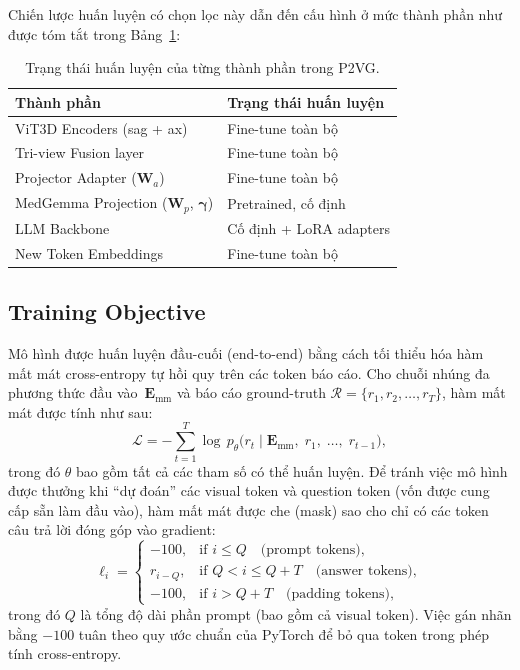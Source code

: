 Chiến lược huấn luyện có chọn lọc này dẫn đến cấu hình ở mức thành phần như được tóm tắt trong Bảng~\ref{tab:trainable}:

\begin{table}[t]
\centering
\caption{Trạng thái huấn luyện của từng thành phần trong P2VG.}
\label{tab:trainable}
\begin{tabular}{ll}
\toprule
\textbf{Thành phần} & \textbf{Trạng thái huấn luyện} \\
\midrule
ViT3D Encoders (sag + ax) & Fine-tune toàn bộ \\
Tri-view Fusion layer      & Fine-tune toàn bộ \\
Projector Adapter ($\mathbf{W}_a$) & Fine-tune toàn bộ \\
MedGemma Projection ($\mathbf{W}_p$, $\boldsymbol{\gamma}$) & Pretrained, cố định \\
LLM Backbone               & Cố định + LoRA adapters \\
New Token Embeddings        & Fine-tune toàn bộ \\
\bottomrule
\end{tabular}
\end{table}


\subsection{Training Objective}

Mô hình được huấn luyện đầu-cuối (end-to-end) bằng cách tối thiểu hóa hàm mất mát cross-entropy tự hồi quy trên các token báo cáo. Cho chuỗi nhúng đa phương thức đầu vào~$\mathbf{E}_{\text{mm}}$ và báo cáo ground-truth $\mathcal{R} = \{r_1, r_2, \ldots, r_T\}$, hàm mất mát được tính như sau:
\begin{equation}
\mathcal{L} = -\sum_{t=1}^{T} \log\, p_\theta\!\big(r_t \mid \mathbf{E}_{\text{mm}},\; r_1,\; \ldots,\; r_{t-1}\big),
\label{eq:loss}
\end{equation}
trong đó $\theta$ bao gồm tất cả các tham số có thể huấn luyện. Để tránh việc mô hình được thưởng khi ``dự đoán'' các visual token và question token (vốn được cung cấp sẵn làm đầu vào), hàm mất mát được che (mask) sao cho chỉ có các token câu trả lời đóng góp vào gradient:
\begin{equation}
\ell_i = 
\begin{cases}
-100,       & \text{if } i \leq Q \quad \text{(prompt tokens)}, \\[2pt]
r_{i-Q},    & \text{if } Q < i \leq Q\!+\!T \quad \text{(answer tokens)}, \\[2pt]
-100,       & \text{if } i > Q\!+\!T \quad \text{(padding tokens)},
\end{cases}
\label{eq:label_mask}
\end{equation}
trong đó $Q$ là tổng độ dài phần prompt (bao gồm cả visual token). Việc gán nhãn bằng $-100$ tuân theo quy ước chuẩn của PyTorch để bỏ qua token trong phép tính cross-entropy.


